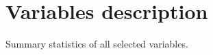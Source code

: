 \section{Variables description}

\begin{table}[htbp]
\centering
\tiny{
}
\caption{Summary statistics of all selected variables.}
\end{table}
